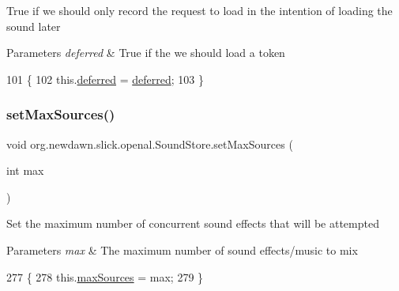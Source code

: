 True if we should only record the request to load in the intention of loading the sound later


\begin{DoxyParams}{Parameters}
{\em deferred} & True if the we should load a token \\
\hline
\end{DoxyParams}

\begin{DoxyCode}
101                                                      \{
102         this.\mbox{\hyperlink{classorg_1_1newdawn_1_1slick_1_1openal_1_1_sound_store_a19c18b8305a40c99b51cde881a6f1d32}{deferred}} = \mbox{\hyperlink{classorg_1_1newdawn_1_1slick_1_1openal_1_1_sound_store_a19c18b8305a40c99b51cde881a6f1d32}{deferred}};
103     \}
\end{DoxyCode}
\mbox{\label{classorg_1_1newdawn_1_1slick_1_1openal_1_1_sound_store_afdd7d412cc9a82f228fd9e6df4c96ca4}} 
\subsubsection{\texorpdfstring{set\+Max\+Sources()}{setMaxSources()}}
{\footnotesize\ttfamily void org.\+newdawn.\+slick.\+openal.\+Sound\+Store.\+set\+Max\+Sources (\begin{DoxyParamCaption}\item[{int}]{max }\end{DoxyParamCaption})\hspace{0.3cm}{\ttfamily [inline]}}

Set the maximum number of concurrent sound effects that will be attempted


\begin{DoxyParams}{Parameters}
{\em max} & The maximum number of sound effects/music to mix \\
\hline
\end{DoxyParams}

\begin{DoxyCode}
277                                        \{
278         this.\mbox{\hyperlink{classorg_1_1newdawn_1_1slick_1_1openal_1_1_sound_store_aca87e8efd1175fdb1f3158abf737b5e7}{maxSources}} = max;
279     \}
\end{DoxyCode}
\mbox{\label{classorg_1_1newdawn_1_1slick_1_1openal_1_1_sound_store_a2c4b2292d9999e9ab7afa5ac5ac27224}} 
